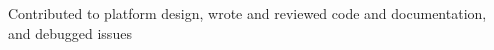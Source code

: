 \begin{cventries}
{\begin{cvitems}
        \item{Contributed to platform design, wrote and reviewed code and documentation, and debugged issues} %
%
      \end{cvitems}
    }


\end{cventries}
